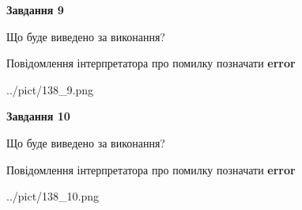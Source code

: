 \documentclass[12pt, ukrainian]{article}
\begin{document}
{{\begin {center}\textbf{Завдання 9}\end {center}}\par
Що буде виведено за виконання? \par
Повідомлення інтерпретатора про помилку позначати \textbf{error}

\begin{center}
	{../pict/138_9.png}
\end{center}
\newpage

{\begin {center}\textbf{Завдання 10}\end {center}}\par
Що буде виведено за виконання? \par
Повідомлення інтерпретатора про помилку позначати \textbf{error}

\begin{center}
	{../pict/138_10.png}
\end{center}
\newpage

}
\end{document}
